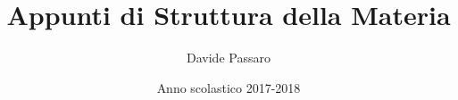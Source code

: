 \documentclass[10pt, a4paper]{article}
\theoremstyle{plain}
\theoremstyle{definition}
\theoremstyle{remark}
\begin{document}
	\begin{titlepage}
		\title{ Appunti di Struttura della Materia}
		\author{Davide Passaro}
		\date{Anno scolastico 2017-2018}
	\end{titlepage}
	\maketitle
	
	
	
		
	
	
	
\end{document}
